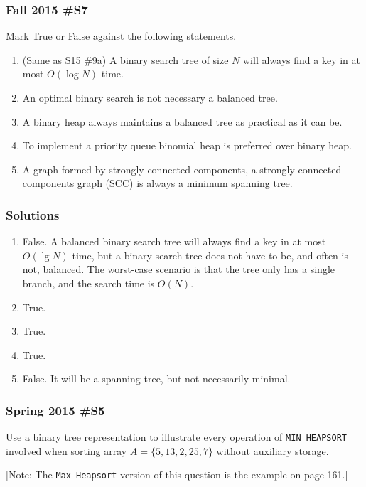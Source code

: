 	
\subsubsection{Fall 2015 \#S7}
	Mark True or False against the following statements.
	\begin{enumerate}[label=\alph*.]
		\item  (Same as S15 \#9a) A binary search tree of size $N$ will always find a key in at most $O(\log N)$ time.
		\item An optimal binary search is not necessary a balanced tree.
		\item A binary heap always maintains a balanced tree as practical as it can be.
		\item To implement a priority queue binomial heap is preferred over binary heap.
		\item A graph formed by strongly connected components, a strongly connected components graph (SCC) is always a minimum spanning tree.  
	\end{enumerate}	
	
\subsubsection{Solutions}

\begin{enumerate}[label=\alph*.]
	\item False.  A balanced binary search tree will always find a key in at most $O(\lg N)$ time, but a binary search tree does not have to be, and often is not, balanced.  The worst-case scenario is that the tree only has a single branch, and the search time is $O(N)$.  
	\item True.  
	\item True.
	\item True.
	\item False.  It will be a spanning tree, but not necessarily minimal.  
\end{enumerate}

\subsubsection{Spring 2015 \#S5}
	Use a binary tree representation to illustrate every operation of \verb|MIN HEAPSORT| involved when sorting array $A = \{5,13,2,25,7\}$ without auxiliary storage.
	
	[Note:  The \verb|Max Heapsort| version of this question is the example on page 161.]
	
